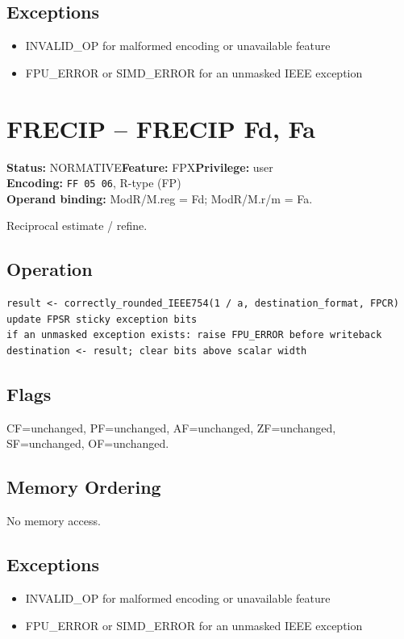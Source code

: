 \documentclass[10pt]{article}
\begin{document}
\subsection*{Exceptions}
\begin{itemize}
\item INVALID\_OP for malformed encoding or unavailable feature
\item FPU\_ERROR or SIMD\_ERROR for an unmasked IEEE exception
\end{itemize}
\clearpage

\section{FRECIP -- FRECIP Fd, Fa}
\textbf{Status:} NORMATIVE\quad \textbf{Feature:} FPX\quad \textbf{Privilege:} user\\
\textbf{Encoding:} \texttt{FF 05 06}, R-type (FP)\\
\textbf{Operand binding:} ModR/M.reg = Fd; ModR/M.r/m = Fa.

Reciprocal estimate / refine.

\subsection*{Operation}
\begin{lstlisting}
result <- correctly_rounded_IEEE754(1 / a, destination_format, FPCR)
update FPSR sticky exception bits
if an unmasked exception exists: raise FPU_ERROR before writeback
destination <- result; clear bits above scalar width
\end{lstlisting}
\subsection*{Flags}
CF=unchanged, PF=unchanged, AF=unchanged, ZF=unchanged, SF=unchanged, OF=unchanged.
\subsection*{Memory Ordering}
No memory access.
\subsection*{Exceptions}
\begin{itemize}
\item INVALID\_OP for malformed encoding or unavailable feature
\item FPU\_ERROR or SIMD\_ERROR for an unmasked IEEE exception
\end{itemize}
\clearpage
\end{document}
